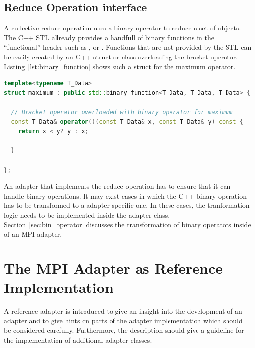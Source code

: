 \subsection{Reduce Operation interface}
A collective reduce operation uses a binary operator to reduce a set
of objects. The C++ STL allready provides a handfull of binary
functions in the ``functional'' header such as ,
 or 
\cite{ref:functional}. Functions that are not provided by the STL can
be easily created by an C++ struct or class overloading the bracket
operator. Listing~\ref{lst:binary_function} shows such a struct for
the maximum operator.

\begin{lstlisting}[language=C++, breaklines=false, label={lst:binary_function}]
template<typename T_Data>
struct maximum : public std::binary_function<T_Data, T_Data, T_Data> {

  // Bracket operator overloaded with binary operator for maximum
  const T_Data& operator()(const T_Data& x, const T_Data& y) const {
    return x < y? y : x;

  }

};
\end{lstlisting}

\noindent An adapter that implements the reduce operation has to
ensure that it can handle binary operations.  It may exist cases in
which the C++ binary operation has to be transformed to a adapter
specific one.  In these cases, the tranformation logic needs to be
implemented inside the adapter class.  Section~\ref{sec:bin_operator}
discusses the transformation of binary operators inside of an MPI
adapter.

\section{The MPI Adapter as Reference Implementation}
\label{sec:cal_mpi_adapter}

A reference adapter is introduced to give an insight into the
development of an adapter and to give hints on parts of the adapter
implementation which should be considered carefully. Furthermore, the
description should give a guideline for the implementation of
additional adapter classes.

